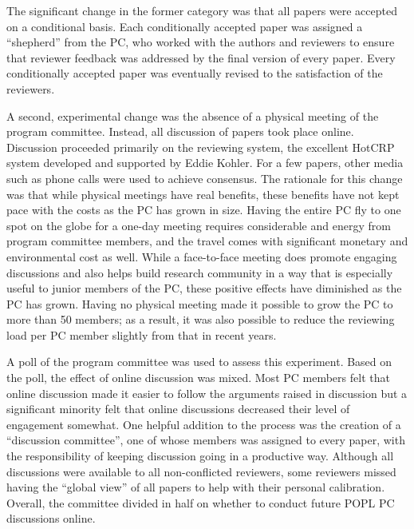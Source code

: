 The significant change in the former category was that all papers were
accepted on a conditional basis. Each conditionally accepted paper
was assigned a ``shepherd'' from the PC, who worked with the authors
and reviewers to ensure that reviewer feedback was addressed by the
final version of every paper. Every conditionally accepted paper was
eventually revised to the satisfaction of the reviewers.

A second, experimental change was the absence of a physical meeting of
the program committee. Instead, all discussion of papers took place
online. Discussion proceeded primarily on the reviewing system,
the excellent HotCRP system developed and supported by Eddie Kohler.
For a few papers, other media such as phone calls were used to achieve
consensus. The
rationale for this change was that while physical meetings have real
benefits, these benefits have not kept pace with the costs as the PC
has grown in size.  Having the entire PC fly to one spot on the globe
for a one-day meeting requires considerable and energy from program
committee members, and the travel comes with significant monetary and
environmental cost as well. While a face-to-face meeting does promote
engaging discussions and also helps build research community in a way
that is especially useful to junior members of the PC, these positive
effects have diminished as the PC has grown. Having no physical
meeting made it possible to grow the PC to more than 50 members; as
a result, it was also possible to reduce the reviewing load per PC
member slightly from that in recent years.

A poll of the program committee was used to assess this experiment.
Based on the poll, the effect of online discussion was mixed. Most
PC members felt that online discussion made it easier to follow the
arguments raised in discussion but a significant minority felt that
online discussions decreased their level of engagement somewhat. One
helpful addition to the process was the creation of a ``discussion
committee'', one of whose members was assigned to every paper, with
the responsibility of keeping discussion going in a productive
way. Although all discussions were available to all non-conflicted
reviewers, some reviewers missed having the ``global view'' of all
papers to help with their personal calibration. Overall, the committee
divided in half on whether to conduct future POPL PC discussions
online.

